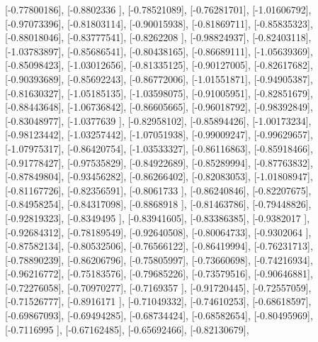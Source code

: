 \documentclass{article}
\begin{document}
       [-0.77800186],
       [-0.8802336 ],
       [-0.78521089],
       [-0.76281701],
       [-1.01606792],
       [-0.97073396],
       [-0.81803114],
       [-0.90015938],
       [-0.81869711],
       [-0.85835323],
       [-0.88018046],
       [-0.83777541],
       [-0.8262208 ],
       [-0.98824937],
       [-0.82403118],
       [-1.03783897],
       [-0.85686541],
       [-0.80438165],
       [-0.86689111],
       [-1.05639369],
       [-0.85098423],
       [-1.03012656],
       [-0.81335125],
       [-0.90127005],
       [-0.82617682],
       [-0.90393689],
       [-0.85692243],
       [-0.86772006],
       [-1.01551871],
       [-0.94905387],
       [-0.81630327],
       [-1.05185135],
       [-1.03598075],
       [-0.91005951],
       [-0.82851679],
       [-0.88443648],
       [-1.06736842],
       [-0.86605665],
       [-0.96018792],
       [-0.98392849],
       [-0.83048977],
       [-1.0377639 ],
       [-0.82958102],
       [-0.85894426],
       [-1.00173234],
       [-0.98123442],
       [-1.03257442],
       [-1.07051938],
       [-0.99009247],
       [-0.99629657],
       [-1.07975317],
       [-0.86420754],
       [-1.03533327],
       [-0.86116863],
       [-0.85918466],
       [-0.91778427],
       [-0.97535829],
       [-0.84922689],
       [-0.85289994],
       [-0.87763832],
       [-0.87849804],
       [-0.93456282],
       [-0.86266402],
       [-0.82083053],
       [-1.01808947],
       [-0.81167726],
       [-0.82356591],
       [-0.8061733 ],
       [-0.86240846],
       [-0.82207675],
       [-0.84958254],
       [-0.84317098],
       [-0.8868918 ],
       [-0.81463786],
       [-0.79448826],
       [-0.92819323],
       [-0.8349495 ],
       [-0.83941605],
       [-0.83386385],
       [-0.9382017 ],
       [-0.92684312],
       [-0.78189549],
       [-0.92640508],
       [-0.80064733],
       [-0.9302064 ],
       [-0.87582134],
       [-0.80532506],
       [-0.76566122],
       [-0.86419994],
       [-0.76231713],
       [-0.78890239],
       [-0.86206796],
       [-0.75805997],
       [-0.73660698],
       [-0.74216934],
       [-0.96216772],
       [-0.75183576],
       [-0.79685226],
       [-0.73579516],
       [-0.90646881],
       [-0.72276058],
       [-0.70970277],
       [-0.7169357 ],
       [-0.91720445],
       [-0.72557059],
       [-0.71526777],
       [-0.8916171 ],
       [-0.71049332],
       [-0.74610253],
       [-0.68618597],
       [-0.69867093],
       [-0.69494285],
       [-0.68734424],
       [-0.68582654],
       [-0.80495969],
       [-0.7116995 ],
       [-0.67162485],
       [-0.65692466],
       [-0.82130679],
\end{document}

